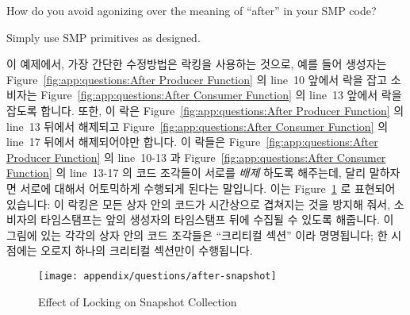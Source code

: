How do you avoid agonizing over the meaning of ``after'' in your
SMP code?

Simply use SMP primitives as designed.
\fi

이 예제에서, 가장 간단한 수정방법은 락킹을 사용하는 것으로, 예를 들어 생성자는
Figure~\ref{fig:app:questions:After Producer Function} 의 line~10 앞에서 락을
잡고 소비자는
Figure~\ref{fig:app:questions:After Consumer Function} 의 line~13 앞에서 락을
잡도록 합니다.
또한, 이 락은
Figure~\ref{fig:app:questions:After Producer Function} 의 line~13 뒤에서
해제되고
Figure~\ref{fig:app:questions:After Consumer Function} 의 line~17 뒤에서
해제되어야만 합니다.
이 락들은
Figure~\ref{fig:app:questions:After Producer Function} 의 line~10-13 과
Figure~\ref{fig:app:questions:After Consumer Function} 의 line~13-17 의 코드
조각들이 서로를 {\em 배제} 하도록 해주는데, 달리 말하자면 서로에 대해서
어토믹하게 수행되게 된다는 말입니다.
이는
Figure~\ref{fig:app:questions:Effect of Locking on Snapshot Collection} 로
표현되어 있습니다:
이 락킹은 모든 상자 안의 코드가 시간상으로 겹쳐지는 것을 방지해 줘서, 소비자의
타임스탬프는 앞의 생성자의 타임스탬프 뒤에 수집될 수 있도록 해줍니다.
이 그림에 있는 각각의 상자 안의 코드 조각들은 ``크리티컬 섹션'' 이라
명명됩니다; 한 시점에는 오로지 하나의 크리티컬 섹션만이 수행됩니다.
\iffalse

In this example, the easiest fix is to use locking, for example,
acquire a lock in the producer before line~10 in
Figure~\ref{fig:app:questions:After Producer Function} and in
the consumer before line~13 in
Figure~\ref{fig:app:questions:After Consumer Function}.
This lock must also be released after line~13 in
Figure~\ref{fig:app:questions:After Producer Function} and
after line~17 in
Figure~\ref{fig:app:questions:After Consumer Function}.
These locks cause the code segments in lines~10-13 of
Figure~\ref{fig:app:questions:After Producer Function} and in lines~13-17 of
Figure~\ref{fig:app:questions:After Consumer Function} to {\em exclude}
each other, in other words, to run atomically with respect to each other.
This is represented in
Figure~\ref{fig:app:questions:Effect of Locking on Snapshot Collection}:
the locking prevents any of the boxes of code from overlapping in time, so
that the consumer's timestamp must be collected after the prior
producer's timestamp.
The segments of code in each box in this figure are termed
``critical sections''; only one such critical section may be executing
at a given time.
\fi

\begin{figure}[htb]
\centering
\texttt{[image: appendix/questions/after-snapshot]}
\caption{Effect of Locking on Snapshot Collection}
\label{fig:app:questions:Effect of Locking on Snapshot Collection}
\end{figure}

